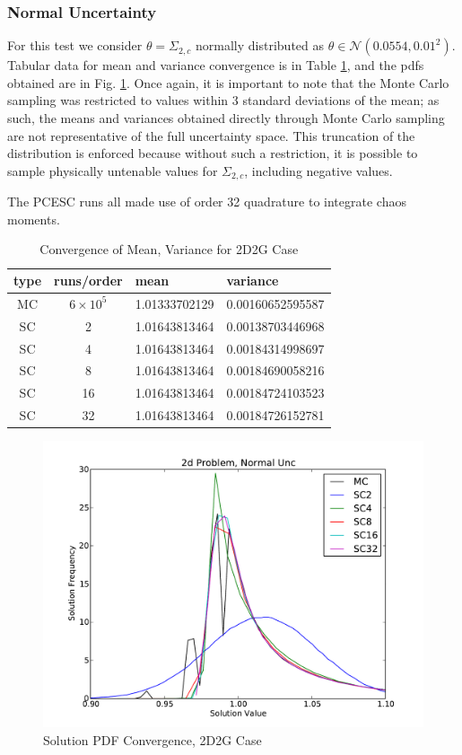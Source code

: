 \subsubsection{Normal Uncertainty}
For this test we consider $\theta=\Sigma_{2,c}$ normally distributed as $\theta\in\mathcal{N}(0.0554,0.01^2)$. Tabular data for mean and variance convergence is in Table \ref{tab:2dcrit}, and the pdfs obtained are in Fig. \ref{fig:2dcrit}.  Once again, it is important to note that the Monte Carlo sampling was restricted to values within 3 standard deviations of the mean; as such, the means and variances obtained directly through Monte Carlo sampling are not representative of the full uncertainty space.  This truncation of the distribution is enforced because without such a restriction, it is possible to sample physically untenable values for $\Sigma_{2,c}$, including negative values.

The PCESC runs all made use of order 32 quadrature to integrate chaos moments.

\begin{table}
\begin{center}
\begin{tabular}{c c|l l}
type & runs/order & mean & variance \\ \hline
MC & $6\times10^5$ & 1.01333702129 & 0.00160652595587 \\
SC & 2  & 1.01643813464 & 0.00138703446968 \\
SC & 4  & 1.01643813464 & 0.00184314998697 \\
SC & 8  & 1.01643813464 & 0.00184690058216 \\
SC & 16 & 1.01643813464 & 0.00184724103523 \\
SC & 32 & 1.01643813464 & 0.00184726152781
\end{tabular}
\end{center}
\caption{Convergence of Mean, Variance for 2D2G Case}
\label{tab:2dcrit}
\end{table}

\begin{figure}[h!]
\centering
   \includegraphics[width=\textwidth]{../graphics/2d_normal_pdfs}
   \caption{Solution PDF Convergence, 2D2G Case}
   \label{fig:2dcrit}
\end{figure}


